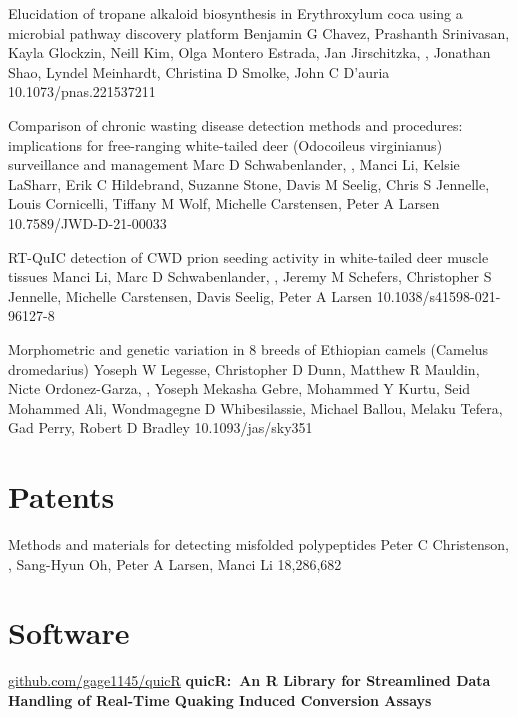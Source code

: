 \documentclass{resume}
\begin{document}
\begin{samepage}
            {Elucidation of tropane alkaloid biosynthesis in Erythroxylum coca using a microbial pathway discovery platform}
            {Benjamin G Chavez, Prashanth Srinivasan, Kayla Glockzin, Neill Kim, Olga Montero Estrada, Jan Jirschitzka, \me{}, Jonathan Shao, Lyndel Meinhardt, Christina D Smolke, John C D’auria}
            {10.1073/pnas.221537211}

            {Comparison of chronic wasting disease detection methods and procedures: implications for free-ranging white-tailed deer (Odocoileus virginianus) surveillance and management}
            {Marc D Schwabenlander, \me{}, Manci Li, Kelsie LaSharr, Erik C Hildebrand, Suzanne Stone, Davis M Seelig, Chris S Jennelle, Louis Cornicelli, Tiffany M Wolf, Michelle Carstensen, Peter A Larsen}
            {10.7589/JWD-D-21-00033}
            
            {RT-QuIC detection of CWD prion seeding activity in white-tailed deer muscle tissues}
            {Manci Li, Marc D Schwabenlander, \me{}, Jeremy M Schefers, Christopher S Jennelle, Michelle Carstensen, Davis Seelig, Peter A Larsen}
            {10.1038/s41598-021-96127-8}

            {Morphometric and genetic variation in 8 breeds of Ethiopian camels (Camelus dromedarius)}
            {Yoseph W Legesse, Christopher D Dunn, Matthew R Mauldin, Nicte Ordonez-Garza, \me{}, Yoseph Mekasha Gebre, Mohammed Y Kurtu, Seid Mohammed Ali, Wondmagegne D Whibesilassie, Michael Ballou, Melaku Tefera, Gad Perry, Robert D Bradley}
            {10.1093/jas/sky351}

        \end{samepage}


    \section{Patents}
        \begin{samepage}
            {Methods and materials for detecting misfolded polypeptides}
            {Peter C Christenson, \me{}, Sang-Hyun Oh, Peter A Larsen, Manci Li}
            {18,286,682}
        \end{samepage}
    

    \section{Software}
        \begin{twocolentry}{\href{https://github.com/gage1145/quicR}{github.com/gage1145/quicR}}
            \textbf{quicR:\ An R Library for Streamlined Data Handling of Real-Time Quaking Induced Conversion Assays}
        \end{twocolentry}
\end{document}
